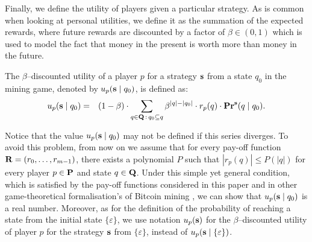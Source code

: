 Finally, we define the utility of players given a particular strategy. 
As is common
when looking at personal utilities, we define it as the summation of the expected rewards, 
where future rewards are discounted by a factor of $\beta \in (0,1)$ which is used to model the fact that money in the present is worth more than money in the future. 
%
\begin{mydef}
\label{def-utility}
The $\beta$--discounted utility of a player $p$ for a strategy $\mathbf{s}$ from a state $q_0$ in
the mining game, denoted by $u_p(\mathbf{s} \mid q_0)$, is defined as:
\begin{eqnarray*}
u_p(\mathbf{s} \mid q_0) & = & (1 - \beta) \cdot \sum_{q \in \mathbf{Q} \,:\, q_0 \subseteq q} \beta^{|q|-|q_0|} \cdot r_p(q) \cdot \mathbf{Pr}^{\mathbf{s}}(q \mid q_0).
\end{eqnarray*}
\end{mydef}
Notice that the value $u_p(\mathbf{s} \mid q_0)$ may not be defined if this series %
diverges. To avoid this problem, from now on we assume that for every pay-off function $\mathbf{R} = (r_0, \ldots, r_{m-1})$, there exists a polynomial $P$ such that $|r_p(q)| \leq P(|q|)$ for every player $p \in \mathbf{P}$ and state $q \in \mathbf{Q}$. Under this simple yet general condition, which is satisfied by the pay-off functions considered in this paper and in other game-theoretical formalisation's of Bitcoin mining \cite{mininggames:2016}, we can show that $u_p(\mathbf{s} \mid q_0)$ is a real number. Moreover, as for the definition of the probability of reaching a state from the initial state $\{\varepsilon\}$, we use notation $u_p(\mathbf{s})$ for the $\beta$--discounted utility of player $p$ for the strategy $\mathbf{s}$ from $\{\varepsilon\}$, instead of $u_p(\mathbf{s} \mid \{\varepsilon\})$. 



